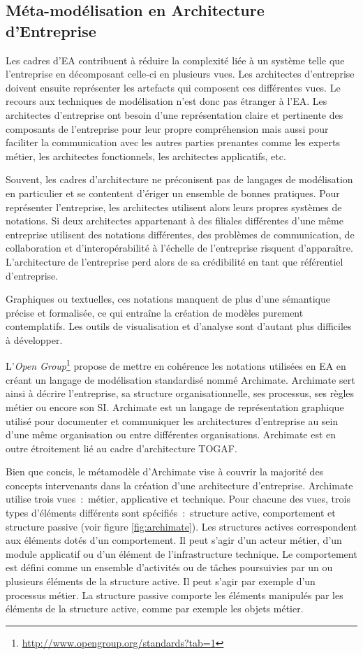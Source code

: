 \subsection{Méta-modélisation en Architecture d'Entreprise}

Les cadres d'EA contribuent à réduire la complexité liée à un système telle que l'entreprise en décomposant celle-ci en plusieurs vues. Les architectes d'entreprise doivent ensuite représenter les artefacts qui composent ces différentes vues. Le recours aux techniques de modélisation n'est donc pas étranger à l'EA. Les architectes d'entreprise ont besoin d'une représentation claire et pertinente des composants de l'entreprise pour leur propre compréhension mais aussi pour faciliter la communication avec les autres parties prenantes comme les experts métier, les architectes fonctionnels, les architectes applicatifs, etc. 

Souvent, les cadres d'architecture ne préconisent pas de langages de modélisation en particulier et se contentent d'ériger un ensemble de bonnes pratiques. Pour représenter l'entreprise, les architectes utilisent alors leurs propres systèmes de notations. Si deux architectes appartenant à des filiales différentes d'une même entreprise utilisent des notations différentes, des problèmes de communication, de collaboration et d'interopérabilité à l'échelle de l'entreprise risquent d'apparaître. L'architecture de l'entreprise perd alors de sa crédibilité en tant que référentiel d'entreprise.

Graphiques ou textuelles, ces notations manquent de plus d'une sémantique précise et formalisée, ce qui entraîne la création de modèles purement contemplatifs. Les outils de visualisation et d'analyse sont d'autant plus difficiles à développer.

L'\textit{Open Group}\footnote{\url{http://www.opengroup.org/standards?tab=1}} propose de mettre en cohérence les notations utilisées en EA en créant un langage de modélisation standardisé nommé Archimate. Archimate sert ainsi à décrire l'entreprise, sa structure organisationnelle, ses processus, ses règles métier ou encore son SI. Archimate est un langage de représentation graphique utilisé pour documenter et communiquer les architectures d'entreprise au sein d'une même organisation ou entre différentes organisations. Archimate est en outre étroitement lié au cadre d'architecture TOGAF. 

Bien que concis, le métamodèle d'Archimate vise à couvrir la majorité des concepts intervenants dans la création d'une architecture d'entreprise. Archimate utilise trois vues~:~métier, applicative et technique. Pour chacune des vues, trois types d'éléments différents sont spécifiés~:~structure active, comportement et structure passive (voir figure \ref{fig:archimate}). Les structures actives correspondent aux éléments dotés d'un comportement. Il peut s'agir d'un acteur métier, d'un module applicatif ou d'un élément de l'infrastructure technique. Le comportement est défini comme un ensemble d'activités ou de tâches poursuivies par un ou plusieurs éléments de la structure active. Il peut s'agir par exemple d'un processus métier. La structure passive comporte les éléments manipulés par les éléments de la structure active, comme par exemple les objets métier. 

